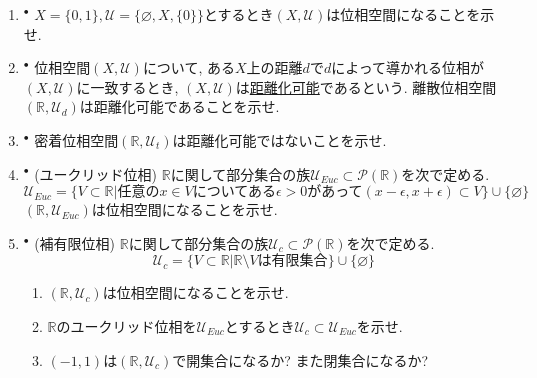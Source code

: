 \documentclass[dvipdfmx,a4paper,11pt]{article}
\newcommand{\R}{\mathbb{R}}
\newcommand{\Q}{\mathbb{Q}}
\theoremstyle{definition}
\begin{document}
\begin{enumerate}[label=\textbf{問}\ref*{sec-open}.\arabic*]
\setlength{\parskip}{0cm}
  \setlength{\itemsep}{7pt} 
\item $^\bullet$ $X = \{ 0,1\}, \mathscr{U} = \{ \varnothing, X, \{0\} \}$とするとき$(X, \mathscr{U})$は位相空間になることを示せ.

\item \label{discrete} $^\bullet$ 位相空間$(X, \mathscr{U})$について, ある$X$上の距離$d$で$d$によって導かれる位相が$(X, \mathscr{U})$に一致するとき,  $(X, \mathscr{U})$は\underline{距離化可能}であるという. 
離散位相空間$(\R, \mathscr{U}_d)$は距離化可能であることを示せ.
\item $^\bullet$\label{trivial} 密着位相空間$(\R, \mathscr{U}_t)$は距離化可能ではないことを示せ.
\item $^\bullet$ (ユークリッド位相) $\R$に関して部分集合の族$\mathscr{U}_{Euc} \subset \mathcal{P}(\R)$を次で定める.
$$
\mathscr{U}_{Euc}= \{V \subset \R | \text{任意の$x \in V$についてある$\epsilon >0$があって$(x - \epsilon, x+ \epsilon) \subset V$} \} \cup \{  \varnothing  \}
$$
$(\R,\mathscr{U}_{Euc})$は位相空間になることを示せ.

\item $^\bullet$ \label{cofinite}(補有限位相)
$\R$に関して部分集合の族$\mathscr{U}_c \subset \mathcal{P}(\R)$を次で定める.
$$
\mathscr{U}_c = \{V \subset \R | \text{$\R \setminus V$は有限集合} \} \cup \{  \varnothing  \}
$$
	\begin{enumerate}
	\setlength{\parskip}{0cm}
  	\setlength{\itemsep}{0pt} 
	\item $(\R,\mathscr{U}_c)$は位相空間になることを示せ.
	\item $\R$のユークリッド位相を$\mathscr{U}_{Euc}$とするとき$\mathscr{U}_c  \subset \mathscr{U}_{Euc}$を示せ. 
	\item $(-1,1)$は$(\R,\mathscr{U}_c)$で開集合になるか? また閉集合になるか?
	\end{enumerate}
	



\end{enumerate}
\end{document}
